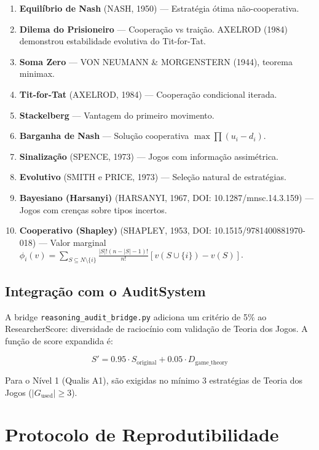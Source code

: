 \documentclass[12pt,a4paper]{article}
\begin{document}
\begin{enumerate}[itemsep=1pt]
  \item \textbf{Equilíbrio de Nash} (NASH, 1950) --- Estratégia ótima não-cooperativa.
  \item \textbf{Dilema do Prisioneiro} --- Cooperação vs traição. AXELROD (1984) demonstrou estabilidade evolutiva do Tit-for-Tat.
  \item \textbf{Soma Zero} --- VON NEUMANN \& MORGENSTERN (1944), teorema minimax.
  \item \textbf{Tit-for-Tat} (AXELROD, 1984) --- Cooperação condicional iterada.
  \item \textbf{Stackelberg} --- Vantagem do primeiro movimento.
  \item \textbf{Barganha de Nash} --- Solução cooperativa $\max \prod (u_i - d_i)$.
  \item \textbf{Sinalização} (SPENCE, 1973) --- Jogos com informação assimétrica.
  \item \textbf{Evolutivo} (SMITH e PRICE, 1973) --- Seleção natural de estratégias.
  \item \textbf{Bayesiano (Harsanyi)} (HARSANYI, 1967, DOI: 10.1287/mnsc.14.3.159) --- Jogos com crenças sobre tipos incertos.
  \item \textbf{Cooperativo (Shapley)} (SHAPLEY, 1953, DOI: 10.1515/9781400881970-018) --- Valor marginal $\phi_i(v) = \sum_{S \subseteq N \setminus \{i\}} \frac{|S|!(n-|S|-1)!}{n!}[v(S \cup \{i\}) - v(S)]$.
\end{enumerate}

\subsection{Integração com o AuditSystem}

A bridge \texttt{reasoning\_audit\_bridge.py} adiciona um critério de 5\% ao ResearcherScore: diversidade de raciocínio com validação de Teoria dos Jogos. A função de score expandida é:

\begin{equation}
  S' = 0.95 \cdot S_{\text{original}} + 0.05 \cdot D_{\text{game\_theory}}
\end{equation}

Para o Nível 1 (Qualis A1), são exigidas no mínimo 3 estratégias de Teoria dos Jogos ($|G_{\text{used}}| \geq 3$).

\section{Protocolo de Reprodutibilidade}
\end{document}
